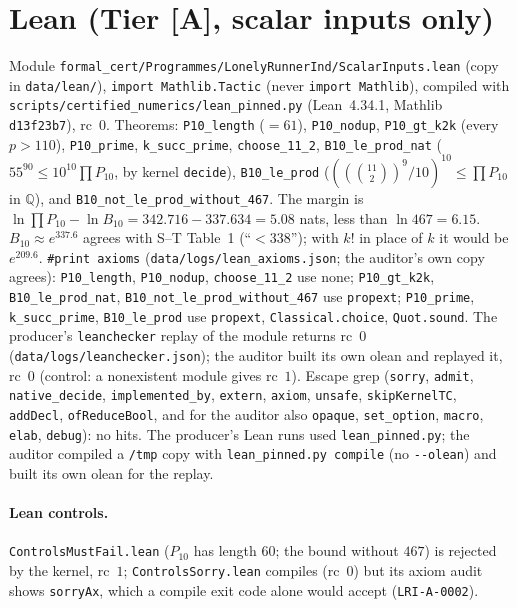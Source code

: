 \documentclass[10pt]{article}
\newcommand{\tier}[1]{\textsf{[#1]}}
\newcommand{\tA}{\tier{A}}
\newcommand{\lean}[1]{\texttt{#1}}
\begin{document}
\section{Lean (Tier \tA{}, scalar inputs only)}\label{sec:lean}
Module \texttt{formal\_cert/Programmes/LonelyRunnerInd/ScalarInputs.lean} (copy in \texttt{data/lean/}), \texttt{import Mathlib.Tactic} (never \texttt{import Mathlib}), compiled with \texttt{scripts/certified\_numerics/lean\_pinned.py} (Lean~4.34.1, Mathlib \texttt{d13f23b7}), rc~$0$. Theorems: \lean{P10\_length} ($=61$), \lean{P10\_nodup}, \lean{P10\_gt\_k2k} (every $p>110$), \lean{P10\_prime}, \lean{k\_succ\_prime}, \lean{choose\_11\_2}, \lean{B10\_le\_prod\_nat} ($55^{90}\le10^{10}\prod P_{10}$, by kernel \texttt{decide}), \lean{B10\_le\_prod} ($((\binom{11}2)^9/10)^{10}\le\prod P_{10}$ in $\mathbb Q$), and \lean{B10\_not\_le\_prod\_without\_467}. The margin is $\ln\prod P_{10}-\ln B_{10}=342.716-337.634=5.08$ nats, less than $\ln467=6.15$. $B_{10}\approx e^{337.6}$ agrees with S--T Table~1 (``$<338$''); with $k!$ in place of $k$ it would be $e^{209.6}$.
\texttt{\#print axioms} (\texttt{data/logs/lean\_axioms.json}; the auditor's own copy agrees): \lean{P10\_length}, \lean{P10\_nodup}, \lean{choose\_11\_2} use none; \lean{P10\_gt\_k2k}, \lean{B10\_le\_prod\_nat}, \lean{B10\_not\_le\_prod\_without\_467} use \lean{propext}; \lean{P10\_prime}, \lean{k\_succ\_prime}, \lean{B10\_le\_prod} use \lean{propext}, \lean{Classical.choice}, \lean{Quot.sound}. The producer's \texttt{leanchecker} replay of the module returns rc~$0$ (\texttt{data/logs/leanchecker.json}); the auditor built its own olean and replayed it, rc~$0$ (control: a nonexistent module gives rc~$1$). Escape grep (\texttt{sorry}, \texttt{admit}, \texttt{native\_decide}, \texttt{implemented\_by}, \texttt{extern}, \texttt{axiom}, \texttt{unsafe}, \texttt{skipKernelTC}, \texttt{addDecl}, \texttt{ofReduceBool}, and for the auditor also \texttt{opaque}, \texttt{set\_option}, \texttt{macro}, \texttt{elab}, \texttt{debug}): no hits. The producer's Lean runs used \texttt{lean\_pinned.py}; the auditor compiled a \texttt{/tmp} copy with \texttt{lean\_pinned.py compile} (no \texttt{-{}-olean}) and built its own olean for the replay.
\paragraph{Lean controls.} \texttt{ControlsMustFail.lean} ($P_{10}$ has length $60$; the bound without $467$) is rejected by the kernel, rc~$1$; \texttt{ControlsSorry.lean} compiles (rc~$0$) but its axiom audit shows \lean{sorryAx}, which a compile exit code alone would accept (\texttt{LRI-A-0002}).
\end{document}

